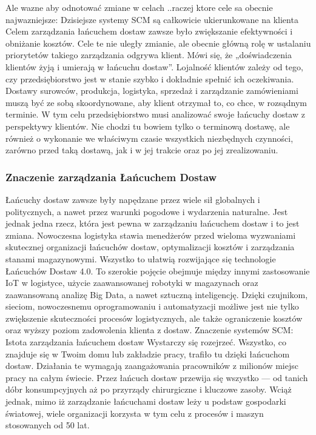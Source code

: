 Ale wazne aby odnotować zmiane w celach ..raczej ktore cele sa obecnie najwazniejsze:
Dzisiejsze systemy SCM są całkowicie ukierunkowane na klienta
Celem zarządzania łańcuchem dostaw zawsze było zwiększanie efektywności i obniżanie kosztów. Cele te nie uległy zmianie, ale obecnie główną rolę w ustalaniu priorytetów takiego zarządzania odgrywa klient. Mówi się, że „doświadczenia klientów żyją i umierają w łańcuchu dostaw”.
Lojalność klientów zależy od tego, czy przedsiębiorstwo jest w stanie szybko i dokładnie spełnić ich oczekiwania. Dostawy surowców, produkcja, logistyka, sprzedaż i zarządzanie zamówieniami muszą być ze sobą skoordynowane, aby klient otrzymał to, co chce, w rozsądnym terminie. W tym celu przedsiębiorstwo musi analizować swoje łańcuchy dostaw z perspektywy klientów. Nie chodzi tu bowiem tylko o terminową dostawę, ale również o wykonanie we właściwym czasie wszystkich niezbędnych czynności, zarówno przed taką dostawą, jak i w jej trakcie oraz po jej zrealizowaniu.\cite{oracle2023}


\vspace{\baselineskip}
\subsubsection{Znaczenie zarządzania Łańcuchem Dostaw}

Łańcuchy dostaw zawsze były napędzane przez wiele sił globalnych i politycznych, a nawet przez warunki pogodowe i wydarzenia naturalne. Jest jednak jedna rzecz, która jest pewna w zarządzaniu łańcuchem dostaw i to jest zmiana. 
Nowoczesna logistyka stawia menedżerów przed wieloma wyzwaniami skutecznej organizacji łańcuchów dostaw, optymalizacji kosztów i zarządzania stanami magazynowymi. Wszystko to ułatwią rozwijające się technologie Łańcuchów Dostaw 4.0. To szerokie pojęcie obejmuje między innymi zastosowanie IoT w logistyce, użycie zaawansowanej robotyki w magazynach oraz zaawansowaną analizę Big Data, a nawet sztuczną inteligencję. Dzięki czujnikom, sieciom, nowoczesnemu oprogramowaniu i automatyzacji możliwe jest nie tylko zwiększenie skuteczności procesów logistycznych, ale także ograniczenie kosztów oraz wyższy poziom zadowolenia klienta z dostaw.
Znaczenie systemów SCM: Istota zarządzania łańcuchem dostaw
Wystarczy się rozejrzeć. Wszystko, co znajduje się w Twoim domu lub zakładzie pracy, trafiło tu dzięki łańcuchom dostaw. Działania te wymagają zaangażowania pracowników z milionów miejsc pracy na całym świecie. Przez łańcuch dostaw przewija się wszystko — od tanich dóbr konsumpcyjnych aż po przyrządy chirurgiczne i kluczowe zasoby. Wciąż jednak, mimo iż zarządzanie łańcuchami dostaw leży u podstaw gospodarki światowej, wiele organizacji korzysta w tym celu z procesów i maszyn stosowanych od 50 lat.\cite{scm2023}

